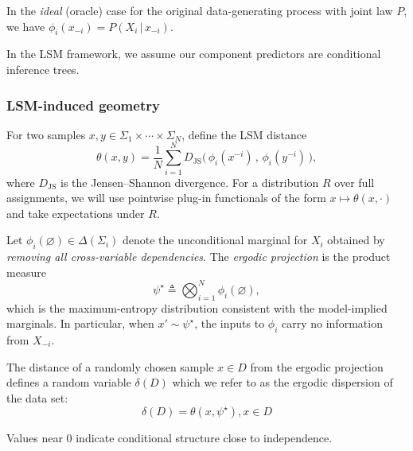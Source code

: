 \documentclass[10pt,journal]{IEEEtran}
\begin{document}
In the \emph{ideal} (oracle) case for the original data-generating process with joint law $P$, we have $\phi_i(x_{-i}) = P(X_i\,|\,x_{-i})$. 

In the LSM framework, we assume our component predictors are conditional inference trees.
\\

\subsubsection*{LSM-induced geometry}
For two samples $x,y\in \Sigma_1\times\cdots\times\Sigma_N$, define the LSM distance
\begin{equation}
\theta(x,y) =\frac{1}{N}\sum_{i=1}^N D_{\mathrm{JS}}\big(\,\phi_i(x^{-i})\,,\,\phi_i(y^{-i})\,\big),
\label{eq:theta-point}
\end{equation}
where $D_{\mathrm{JS}}$ is the Jensen--Shannon divergence. For a distribution $R$ over full assignments, we will use pointwise plug-in functionals of the form $x\mapsto \theta(x,\cdot)$ and take expectations under $R$.

\begin{defn}
Let $\phi_i(\varnothing)\in\Delta(\Sigma_i)$ denote the unconditional marginal for $X_i$ obtained by \emph{removing all cross-variable dependencies}. The \emph{ergodic projection} is the product measure
\begin{equation}
\psi^\star \triangleq \bigotimes_{i=1}^N \phi_i(\varnothing),
\end{equation}
which is the maximum-entropy distribution consistent with the model-implied marginals. In particular, when $x'\sim\psi^\star$, the inputs to $\phi_i$ carry no information from $X_{-i}$.
\end{defn}
\begin{defn}
The distance of a randomly chosen sample $x \in D$ from the ergodic projection defines a random variable $\delta(D)$ which we refer to as the ergodic dispersion of the data set:
\begin{equation}
\delta(D) = \theta(x,\psi^\star), x \in D
\label{eq:delta-x}
\end{equation}
\end{defn}
Values near $0$ indicate conditional structure close to independence.

\end{document}
